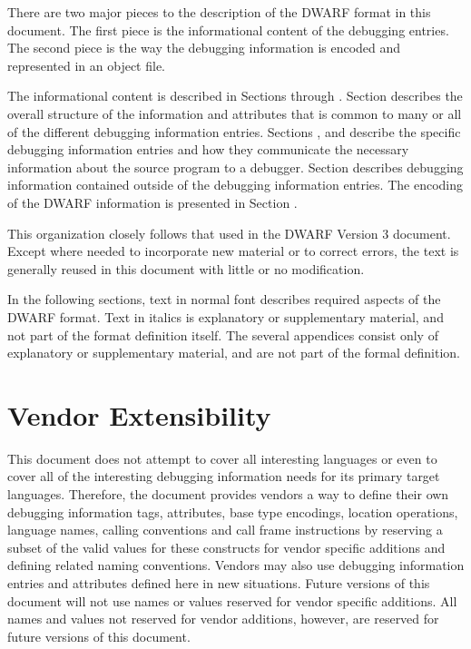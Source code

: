 There are two major pieces to the description of the DWARF
format in this document. The first piece is the informational
content of the debugging entries. The second piece is the
way the debugging information is encoded and represented in
an object file.

The informational content is described in 
Sections  
through
. 
Section  
describes the overall structure of the information
and attributes that is common to many or all of the different
debugging information entries. 
Sections , 
 and 
 describe
the specific debugging information entries and how they
communicate the necessary information about the source program
to a debugger. 
Section  
describes debugging information
contained outside of the debugging information entries. The
encoding of the DWARF information is presented in 
Section .

This organization closely follows that used in the DWARF
Version 3 document. Except where needed to incorporate
new material or to correct errors, the 
text is generally reused in this document with little or
no modification.

In the following sections, text in normal font describes
required aspects of the DWARF format.  Text in italics is
explanatory or supplementary material, and not part of the
format definition itself. The several appendices consist only
of explanatory or supplementary material, and are not part
of the formal definition.
\section{Vendor Extensibility}

This document does not attempt to cover all interesting
languages or even to cover all of the interesting debugging
information needs for its primary target languages. 
Therefore,
the document provides vendors a way to define their own
debugging information tags, attributes, base type encodings,
location operations, language names, calling conventions and
call frame instructions by reserving a subset of the valid
values for these constructs for vendor specific additions
and defining related naming conventions. 
Vendors may also use
debugging information entries and attributes defined here in
new situations. 
Future versions of this document will not use
names or values reserved for vendor specific additions. 
All
names and values not reserved for vendor additions, however,
are reserved for future versions of this document.

